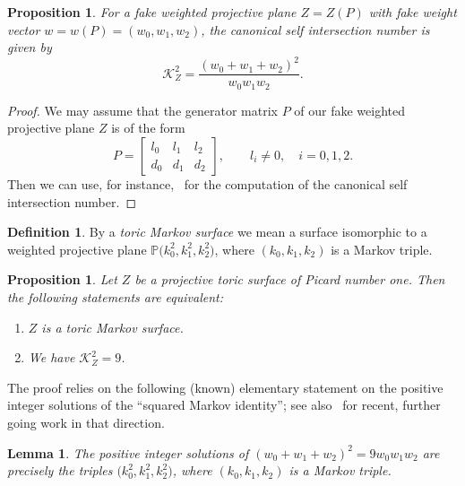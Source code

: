 \documentclass[10pt,a4paper]{amsart}
\newtheorem{lem}[thm]{Lemma}
\newtheorem{prop}[thm]{Proposition}
\theoremstyle{definition}
\newtheorem{defi}[thm]{Definition}
\def\PP{{\mathbb P}}
\begin{document}
\begin{prop}\label{prop:fwppKsquare}
For a fake weighted projective plane $Z = Z(P)$
with fake weight vector $w = w(P) = (w_0,w_1,w_2)$,
the canonical self intersection number is given by
\[
\mathcal{K}_Z^2
 =
\frac{(w_0+w_1+w_2)^2}{w_0w_1w_2}.
\]
\end{prop}


\begin{proof}
We may assume that the generator matrix $P$
of our fake weighted projective plane $Z$ is
of the form
\[
P
 =
\begin{bmatrix}
l_0 & l_1 & l_2
\\
d_0 & d_1 & d_2
\end{bmatrix},
\qquad
l_i \ne 0, \quad i = 0,1,2.
\]
Then we can use, for instance,~\cite[Remark~3.3]{HaHaSp}
for the computation of the canonical self intersection
number.
\end{proof}


\begin{defi}
By a \emph{toric Markov surface} we mean a surface
isomorphic to a weighted projective plane
$\PP\bigl(k_0^2,k_1^2,k_2^2\bigr)$, where $(k_0,k_1,k_2)$ is
a Markov triple.
\end{defi}


\begin{prop}
\label{prop:toricmarkovchar}
Let $Z$ be a projective toric surface of
Picard number one.
Then the following statements are equivalent:
\begin{enumerate}\itemsep=0pt
\item[$(i)$]
$Z$ is a toric Markov surface.
\item[$(ii)$]
We have $\mathcal{K}_Z^2 = 9$.
\end{enumerate}
\end{prop}


The proof relies on the following (known)
elementary statement on the positive integer
solutions of the ``squared Markov identity'';
see also~\cite{GyMa} for recent, further going
work in that direction.

\goodbreak

\begin{lem}
\label{lem:diophantic}
The positive integer solutions of $(w_0+w_1+w_2)^2 = 9w_0w_1w_2$
are precisely the triples $\bigl(k_0^2,k_1^2,k_2^2\bigr)$,
where $(k_0,k_1,k_2)$ is a Markov triple.
\end{lem}
\end{document}
